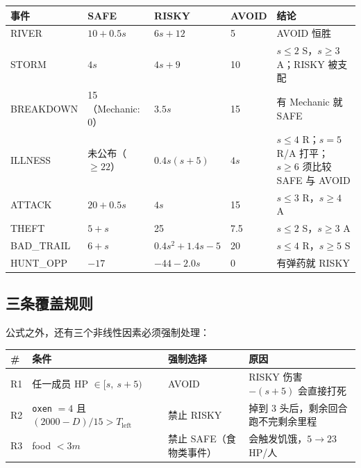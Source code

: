 \documentclass[UTF8,11pt,a4paper]{ctexart}
\begin{document}
\begin{center}
\small
\begin{longtable}{@{}p{2.8cm}p{3.2cm}p{3.4cm}p{2.2cm}p{3.2cm}@{}}
\toprule
\textbf{事件} & \textbf{SAFE} & \textbf{RISKY} & \textbf{AVOID} & \textbf{结论} \\
\midrule
\endhead
RIVER & $10+0.5s$ & $6s+12$ & 5 & AVOID 恒胜 \\
STORM & $4s$ & $4s+9$ & 10 & $s\le2$ S，$s\ge3$ A；RISKY 被支配 \\
BREAKDOWN & 15（Mechanic: 0） & $3.5s$ & 15 & 有 Mechanic 就 SAFE \\
ILLNESS & 未公布（$\ge22$） & $0.4s(s+5)$ & $4s$ & $s\le4$ R；$s=5$ R/A 打平；$s\ge6$ 须比较 SAFE 与 AVOID \\
ATTACK & $20+0.5s$ & $4s$ & 15 & $s\le3$ R，$s\ge4$ A \\
THEFT & $5+s$ & 25 & 7.5 & $s\le2$ S，$s\ge3$ A \\
BAD\_TRAIL & $6+s$ & $0.4s^2+1.4s-5$ & 20 & $s\le4$ R，$s\ge5$ S \\
HUNT\_OPP & $-17$ & $-44-2.0s$ & 0 & 有弹药就 RISKY \\
\bottomrule
\end{longtable}
\end{center}

\subsection{三条覆盖规则}

公式之外，还有三个非线性因素必须强制处理：

\begin{center}
\small
\begin{longtable}{@{}p{0.7cm}p{5.0cm}p{4.0cm}p{4.2cm}@{}}
\toprule
\textbf{\#} & \textbf{条件} & \textbf{强制选择} & \textbf{原因} \\
\midrule
\endhead
R1 & 任一成员 HP $\in[s,\ s+5)$ & AVOID & RISKY 伤害 $-(s+5)$ 会直接打死 \\
R2 & \texttt{oxen} $=4$ 且 $(2000-D)/15>T_{\text{left}}$ & 禁止 RISKY & 掉到 3 头后，剩余回合跑不完剩余里程 \\
R3 & food $<3m$ & 禁止 SAFE（食物类事件） & 会触发饥饿，$5\to23$ HP/人 \\
\bottomrule
\end{longtable}
\end{center}
\end{document}
